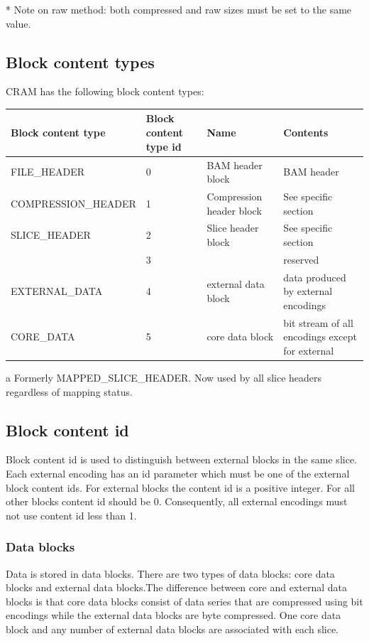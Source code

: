 \documentclass[a4paper]{article}
\begin{document}
* Note on raw method: both compressed and raw sizes must be set to the same value.

\subsection{\textbf{Block content types}}

CRAM has the following block content types:

\begin{threeparttable}[t]
\begin{tabular}{|>{\raggedright}p{143pt}|>{\raggedright}p{45pt}|>{\raggedright}p{116pt}|>{\raggedright}p{114pt}|}
\hline
\textbf{Block content type} & \textbf{Block content type id} & \textbf{Name} & \textbf{Contents}\tabularnewline
\hline
FILE\_HEADER & 0 & BAM header block & BAM header\tabularnewline
\hline
COMPRESSION\_HEADER & 1 & Compression header block & See specific section\tabularnewline
\hline
SLICE\_HEADER\tnote{a} & 2 & Slice header block & See specific section\tabularnewline
\hline
 & 3 &  & reserved\tabularnewline
\hline
EXTERNAL\_DATA & 4 & external data block & data produced by external encodings\tabularnewline
\hline
CORE\_DATA & 5 & core data block & bit stream of all encodings except for external\tabularnewline
\hline
\end{tabular}
\begin{tablenotes}
\item[a] Formerly MAPPED\_SLICE\_HEADER.  Now used by all slice headers regardless of mapping status.
\end{tablenotes}
\end{threeparttable}

\subsection{\textbf{Block content id}}

Block content id is used to distinguish between external blocks in the same slice. 
Each external encoding has an id parameter which must be one of the external block 
content ids. For external blocks the content id is a positive integer. For all 
other blocks content id should be 0. Consequently, all external encodings must 
not use content id less than 1. 

\subsubsection*{Data blocks}

Data is stored in data blocks. There are two types of data blocks: core data blocks 
and external data blocks.The difference between core and external data blocks is 
that core data blocks consist of data series that are compressed using bit encodings 
while the external data blocks are byte compressed. One core data block and any 
number of external data blocks are associated with each slice.
\end{document}
